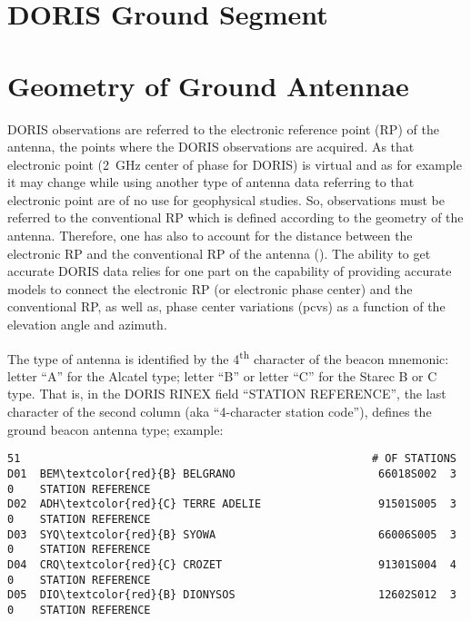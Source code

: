 \section{DORIS Ground Segment}
\label{sec:doris-ground-segment}

\section{Geometry of Ground Antennae}
DORIS observations are referred to the electronic reference point (RP) of the 
antenna, the points where the DORIS observations  are  acquired.  As that 
electronic  point (\SI{2}{\GHz} center of phase for DORIS) is virtual and as 
for example it may change while using another type of antenna data referring 
to that electronic point are of no use for geophysical studies. So, 
observations must be referred to the conventional RP which is defined 
according to the geometry of the antenna. Therefore, one has also to account 
for the distance between the electronic RP and the conventional RP of the 
antenna (\cite{TOURAIN2016}). The ability to get accurate DORIS data relies 
for one part on the capability of providing accurate models to connect the 
electronic RP (or electronic phase center) and the conventional RP, as well 
as, phase center variations (\glspl{pcv}) as a function of the elevation angle 
and azimuth.

The type of antenna is identified by the 4\textsuperscript{th} character of 
the beacon mnemonic: letter ``A'' for the Alcatel type; letter ``B'' or letter 
``C'' for the Starec B or C type.  That is, in the DORIS RINEX field 
``STATION REFERENCE'', the last character of the second column (aka 
``4-character station code''), defines the ground beacon antenna type; 
example:

\begin{adjustbox}{max width=\linewidth , fbox=0.5pt}
\begin{BVerbatim}[commandchars=\\\{\}]
    51                                                      # OF STATIONS       
D01  BEM\textcolor{red}{B} BELGRANO                      66018S002  3   0    STATION REFERENCE   
D02  ADH\textcolor{red}{C} TERRE ADELIE                  91501S005  3   0    STATION REFERENCE   
D03  SYQ\textcolor{red}{B} SYOWA                         66006S005  3   0    STATION REFERENCE   
D04  CRQ\textcolor{red}{C} CROZET                        91301S004  4   0    STATION REFERENCE   
D05  DIO\textcolor{red}{B} DIONYSOS                      12602S012  3   0    STATION REFERENCE
\end{BVerbatim}
\end{adjustbox}

